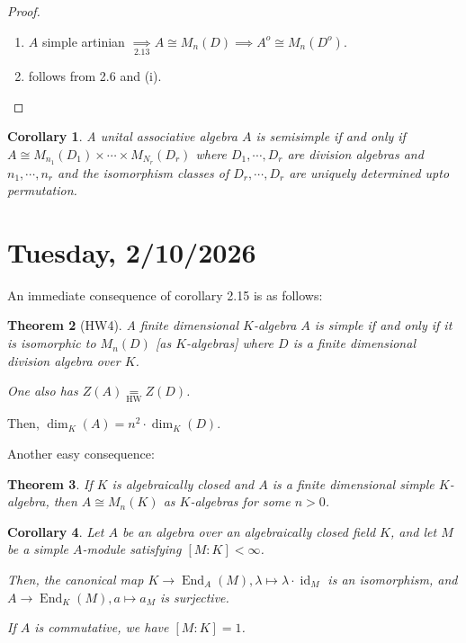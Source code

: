 \documentclass{article}
\theoremstyle{definition}
\theoremstyle{plain}
\newtheorem{theorem}{Theorem}[section]
\newtheorem{corollary}[theorem]{Corollary}
\theoremstyle{remark}
\begin{document}
    \begin{proof}
        \begin{enumerate}[label=\roman*)]
            \item \(A\) simple artinian \(\underset{2.13}{\implies} A \cong M_n(D) \implies A^o \cong M_n(D^o)\).
            \item follows from 2.6 and (i).
        \end{enumerate} 
    \end{proof}

    \begin{corollary}
        A unital associative algebra \(A\) is semisimple if and only if \(A \cong M_{n_1}(D_1) \times \cdots \times M_{N_r}(D_r)\) where \(D_1 , \cdots , D_r\) are division algebras and \(n_1, \cdots , n_r\) and the isomorphism classes of \(D_r, \cdots , D_r\) are uniquely determined upto permutation. 
    \end{corollary}

    \section*{Tuesday, 2/10/2026}
    
    An immediate consequence of corollary 2.15 is as follows:

    \begin{theorem}
        [HW4] A finite dimensional \(K\)-algebra \(A\) is simple if and only if it is isomorphic to \(M_n(D)\) [as \(K\)-algebras] where \(D\) is a finite dimensional division algebra over \(K\).

        One also has \(Z(A) \underset{\text{HW}}{=} Z(D)\).
    \end{theorem}

    Then, \(\dim_K(A) = n^2 \cdot \dim_K(D)\).

    Another easy consequence:

    \begin{theorem}
        If \(K\) is algebraically closed and \(A\) is a finite dimensional simple \(K\)-algebra, then \(A \cong M_n(K)\) as \(K\)-algebras for some \(n > 0\).
    \end{theorem}

    \begin{corollary}
        Let \(A\) be an algebra over an algebraically closed field \(K\), and let \(M\) be a simple \(A\)-module satisfying \([M : K] < \infty\).

        Then, the canonical map \(K \to \operatorname{End}_A(M), \lambda \mapsto \lambda \cdot \operatorname{id}_{M}\) is an isomorphism, and \(A \to \operatorname{End}_K(M), a \mapsto a_M\) is surjective.

        If \(A\) is commutative, we have \([M:K] = 1\).
    \end{corollary}
\end{document}
